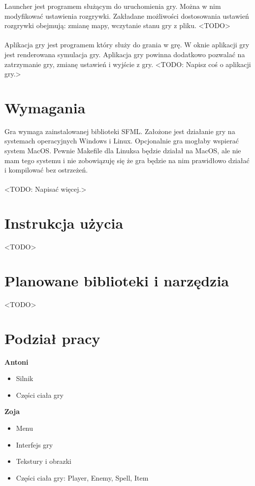 \documentclass[12pt, titlepage]{article}
\begin{document}
\noindent
Launcher jest programem służącym do uruchomienia gry.
Można w nim modyfikować ustawienia rozgrywki. Zakładane
możliwości dostosowania ustawień rozgrywki obejmują:
zmianę mapy, wczytanie stanu gry z pliku. <TODO>
\\~\\
Aplikacja gry jest programem który służy
do grania w grę. W oknie aplikacji gry jest
renderowana symulacja gry. Aplikacja gry
powinna dodatkowo pozwalać na zatrzymanie
gry, zmianę ustawień i wyjście z gry. <TODO:
Napisz coś o aplikacji gry.>

\section{Wymagania}
Gra wymaga zainstalowanej biblioteki
SFML. Założone jest działanie gry
na systemach operacyjnych Windows i
Linux. Opcjonalnie gra mogłaby wspierać
system MacOS. Pewnie Makefile dla Linuksa
będzie działał na MacOS, ale nie mam tego
systemu i nie zobowiązuję się że gra będzie
na nim prawidłowo działać i kompilować
bez ostrzeżeń.
\\~\\
<TODO: Napisać więcej.>

\section{Instrukcja użycia}
<TODO>

\section{Planowane biblioteki i narzędzia}
<TODO>

\section{Podział pracy}
\textbf{Antoni}
\begin{itemize}
	\item Silnik
	\item Części ciała gry
\end{itemize}
 
\textbf{Zoja}
\begin{itemize}
	\item Menu
	\item Interfejs gry
	\item Tekstury i obrazki
	\item Części ciała gry: Player, Enemy, Spell, Item
\end{itemize}
\end{document}

